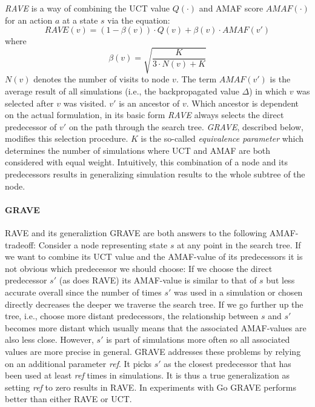 \newpage
\textit{RAVE} is a way of combining the UCT value $Q(\cdot)$ and AMAF score $AMAF(\cdot)$ for an action $a$ at a state $s$ via the equation:
\begin{equation*}
    RAVE(v) = (1-\beta(v)) \cdot Q(v) + \beta(v) \cdot AMAF(v')
\end{equation*}
where 
\begin{equation*}
    \beta(v) = \sqrt{\frac{K}{3 \cdot N(v) + K}}
\end{equation*}
$N(v)$ denotes the number of visits to node $v$. The term $AMAF(v')$ is the average result of all simulations (i.e., the backpropagated value $\Delta$) in which $v$ was selected after $v$ was visited. $v'$ is an ancestor of $v$. Which ancestor is dependent on the actual formulation, in its basic form \textit{RAVE} always selects the direct predecessor of $v'$ on the path through the search tree. \textit{GRAVE}, described below, modifies this selection procedure. $K$ is the so-called \textit{equivalence parameter} which determines the number of simulations where UCT and AMAF are both considered with equal weight. Intuitively, this combination of a node and its predecessors results in generalizing simulation results to the whole subtree of the node.
\paragraph{GRAVE}
RAVE and its generaliztion GRAVE \cite{cazenave2015generalized} are both answers to the following AMAF-tradeoff: Consider a node representing state $s$ at any point in the search tree. If we want to combine its UCT value and the AMAF-value of its predecessors it is not obvious which predecessor we should choose: If we choose the direct predecessor $s'$ (as does RAVE) its AMAF-value is similar to that of $s$ but less accurate overall since the number of times $s'$ was used in a simulation or chosen directly decreases the deeper we traverse the search tree. If we go further up the tree, i.e., choose more distant predecessors, the relationship between $s$ and $s'$ becomes more distant which usually means that the associated AMAF-values are also less close. However, $s'$ is part of simulations more often so all associated values are more precise in general. GRAVE addresses these problems by relying on an additional parameter \textit{ref}. It picks $s'$ as the closest predecessor that has been used at least \textit{ref} times in simulations. It is thus a true generalization as setting \textit{ref} to zero results in RAVE. In experiments with Go GRAVE performs better than either RAVE or UCT.
